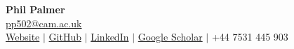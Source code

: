 \documentclass[letterpaper,11pt]{article}
\begin{document}

\begin{center}
    {\Huge\bfseries Phil Palmer} \\ \vspace{3pt}
    \href{mailto:pp502@cam.ac.uk}{\color{teal}pp502@cam.ac.uk} \\
    \href{https://philpalmer.github.io/blog/}{\color{teal}Website} $|$ \href{https://github.com/PhilPalmer}{\color{teal}GitHub} $|$ \href{https://uk.linkedin.com/in/phil-palmer}{\color{teal}LinkedIn} $|$ \href{https://scholar.google.com/citations?user=VMrmNJcAAAAJ}{\color{teal}Google Scholar}  $|$  +44 7531 445 903 \\
\end{center}



\end{document}
